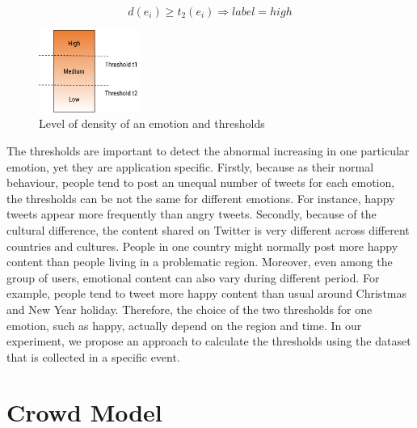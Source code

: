\begin{equation}
\label{eq:highDensityEmotion}
d(e_i) \geq t_2(e_i) \Rightarrow label = high
\end{equation}

\begin{figure}[htb!] 
\centering    
\includegraphics[width=0.3\textwidth]{LevelOfEmotion}
\caption{Level of density of an emotion and thresholds}
\label{fig:levelOfDensity}
\end{figure}

The thresholds are important to detect the abnormal increasing in one particular emotion, yet they are application specific. Firstly, because as their normal behaviour, people tend to post an unequal number of tweets for each emotion, the thresholds can be not the same for different emotions. For instance, happy tweets appear more frequently than angry tweets. Secondly, because of the cultural difference, the content shared on Twitter is very different across different countries and cultures. People in one country might normally post more happy content than people living in a problematic region. Moreover, even among the group of users, emotional content can also vary during different period. For example, people tend to tweet more happy content than usual around Christmas and New Year holiday. Therefore, the choice of the two thresholds for one emotion, such as happy, actually depend on the region and time. In our experiment, we propose an approach to calculate the thresholds using the dataset that is collected in a specific event.

\section{Crowd Model}

